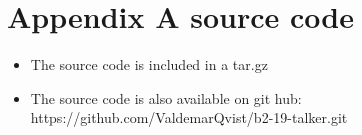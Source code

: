 \chapter{Appendix A source code}\label{ch:appAlabel}


\begin{itemize}
    
    
    \item The source code is included in a tar.gz
    \item The source code is also available on git hub:\\https://github.com/ValdemarQvist/b2-19-talker.git\\
 



\end{itemize}






